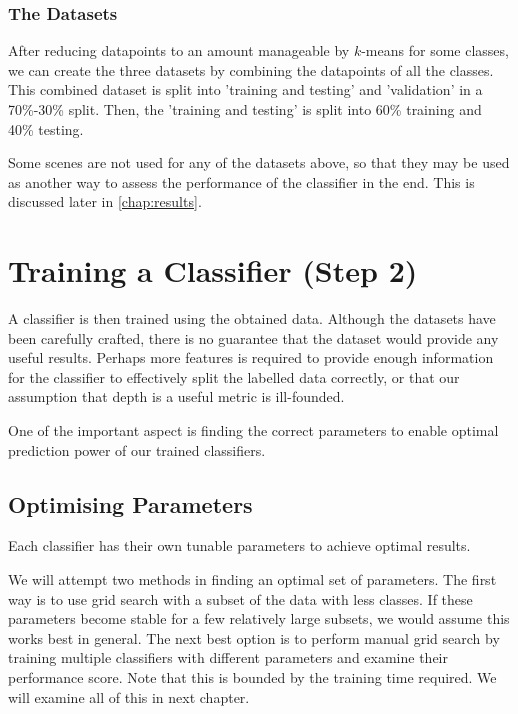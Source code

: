 \subsubsection*{The Datasets} 
After reducing datapoints to an amount manageable by $k$-means for some classes, we can create the three datasets by combining the datapoints of all the classes. This combined dataset is split into 'training and testing' and 'validation' in a 70\%-30\% split. Then, the 'training and testing' is split into 60\% training and 40\% testing. 

Some scenes are not used for any of the datasets above, so that they may be used as another way to assess the performance of the classifier in the end. This is discussed later in \autoref{chap:results}.



\section{Training a Classifier (Step 2)}
A classifier is then trained using the obtained data. Although the datasets have been carefully crafted, there is no guarantee that the dataset would provide any useful results. Perhaps more features is required to provide enough information for the classifier to effectively split the labelled data correctly, or that our assumption that depth is a useful metric is ill-founded.

One of the important aspect is finding the correct parameters to enable optimal prediction power of our trained classifiers.

\subsection{Optimising Parameters}
Each classifier has their own tunable parameters to achieve optimal results.  

We will attempt two methods in finding an optimal set of parameters. The first way is to use grid search with a subset of the data with less classes. If these parameters become stable for a few relatively large subsets, we would assume this works best in general. The next best option is to perform manual grid search by training multiple classifiers with different parameters and examine their performance score. Note that this is bounded by the training time required. We will examine all of this in next chapter.

